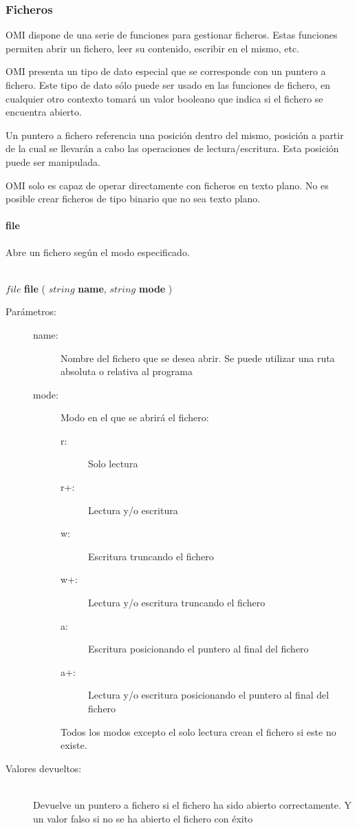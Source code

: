 \subsubsection{Ficheros}
OMI dispone de una serie de funciones para gestionar ficheros. Estas funciones permiten
abrir un fichero, leer su contenido, escribir en el mismo, etc.

OMI presenta un tipo de dato especial que se corresponde con un puntero a fichero. Este tipo 
de  dato sólo puede ser usado en las funciones de fichero, en cualquier otro contexto 
tomará un valor booleano que indica si el fichero se encuentra abierto. 

Un puntero a fichero referencia una posición dentro del mismo, posición a partir de la cual 
se llevarán a cabo las operaciones de lectura/escritura. Esta posición puede ser manipulada.

OMI solo es capaz de operar directamente con ficheros en texto plano. No es posible crear 
ficheros de tipo binario que no sea texto plano.

\paragraph{file}
Abre un fichero según el modo especificado. 

\hfill \\ $file$ \textbf{file} ( $string$ \textbf{name}, $string$ \textbf{mode}  )  
\begin{description}
\item [Parámetros:] \hfill 
   \begin{description}
   \item[name:] Nombre del fichero que se desea abrir. Se puede utilizar una ruta absoluta o relativa al programa
   \item[mode:] Modo en el que se abrirá el fichero:
      \begin{description}
         \item [r:] Solo lectura
         \item [r+:] Lectura y/o escritura
         \item [w:] Escritura truncando el fichero
         \item [w+:] Lectura y/o escritura truncando el fichero
         \item [a:] Escritura posicionando el puntero al final del fichero
         \item [a+:] Lectura y/o escritura posicionando el puntero al final del fichero
      \end{description} \hfill 
      
      Todos los modos excepto el solo lectura crean el fichero si este no existe. 
   \end{description}
\item[Valores devueltos:] \hfill \\
   Devuelve un puntero a fichero si el fichero ha sido abierto correctamente. Y un valor falso si no se ha 
   abierto el fichero con éxito
\end{description}

